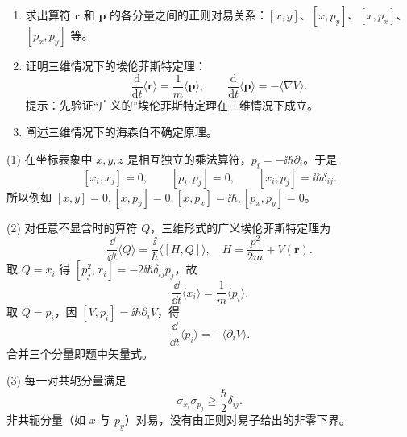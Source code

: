\begin{question}
\begin{enumerate}
\item 求出算符 $\mathbf r$ 和 $\mathbf p$ 的各分量之间的正则对易关系：$[x,y]$、$[x,p_y]$、$[x,p_x]$、$[p_x,p_y]$ 等。
\item 证明三维情况下的埃伦菲斯特定理：
\[
\frac{\mathrm d}{\mathrm dt}\langle \mathbf r\rangle=\frac1m\langle \mathbf p\rangle,
\qquad
\frac{\mathrm d}{\mathrm dt}\langle \mathbf p\rangle=-\langle \nabla V\rangle .
\]
提示：先验证“广义的”埃伦菲斯特定理在三维情况下成立。
\item 阐述三维情况下的海森伯不确定原理。
\end{enumerate}
\end{question}
\begin{solution}

(1) 在坐标表象中 $x,y,z$ 是相互独立的乘法算符，$p_i=-\ii\hbar\partial_i$。于是
\[
[x_i,x_j]=0,\qquad [p_i,p_j]=0,\qquad [x_i,p_j]=\ii\hbar\delta_{ij}.
\]
所以例如 $[x,y]=0,[x,p_y]=0,[x,p_x]=\ii\hbar,[p_x,p_y]=0$。

(2) 对任意不显含时的算符 $Q$，三维形式的广义埃伦菲斯特定理为
\[
\frac{\dd}{\dd t}\langle Q\rangle=\frac{\ii}{\hbar}\langle[H,Q]\rangle,
\quad H=\frac{p^2}{2m}+V(\mathbf r).
\]
取 $Q=x_i$ 得 $[p_j^2,x_i]=-2\ii\hbar\delta_{ij}p_j$，故
\[
\frac{\dd}{\dd t}\langle x_i\rangle=\frac{1}{m}\langle p_i\rangle.
\]
取 $Q=p_i$，因 $[V,p_i]=\ii\hbar\partial_iV$，得
\[
\frac{\dd}{\dd t}\langle p_i\rangle=-\langle\partial_iV\rangle.
\]
合并三个分量即题中矢量式。

(3) 每一对共轭分量满足
\[
\sigma_{x_i}\sigma_{p_j}\ge \frac{\hbar}{2}\delta_{ij}.
\]
非共轭分量（如 $x$ 与 $p_y$）对易，没有由正则对易子给出的非零下界。

\end{solution}

